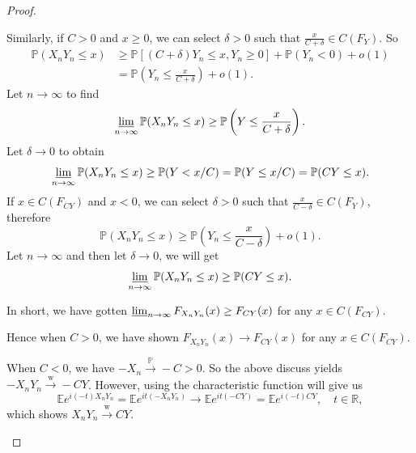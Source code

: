 \documentclass[12pt]{article}
\renewcommand{\(}{\left(}%
\renewcommand{\)}{\right)}%
\renewcommand{\[}{\left[}%
\renewcommand{\]}{\right]}%
\renewcommand{\r}{\mathbb{R}}
\newcommand{\p}{\mathbb{P}}
\newtheorem{proof}{Proof.}}
\begin{document}
\begin{proof}
\begin{enumerate}
  		Similarly, if $C>0$ and $x\geq 0$, we can select $\delta>0$ such that $\frac{x}{C+\delta}\in C(F_{Y})$. So
  		\begin{equation*}
  			\begin{split}
  				\p(X_nY_n\leq x)&\geq \p[(C+\delta)Y_n\leq x,Y_n\geq 0]+\p(Y_n<0)+o(1)\\
  				&=\p\(Y_n\leq \frac{x}{C+\delta} \)+o(1).
  			\end{split}
  		\end{equation*}
  		Let $n\to\infty$ to find
  		\begin{equation*}
  			\varliminf_{n\to\infty}\p(X_nY_n\leq x)\geq \p\(Y\leq \frac{x}{C+\delta }\).
  		\end{equation*}
  		Let $\delta\to 0$ to obtain
  		\begin{equation*}
  			\varliminf_{n\to\infty}\p(X_nY_n\leq x)\geq \p(Y<x/C)=\p(Y\leq  x/C)=\p(CY\leq x).
  		\end{equation*}
  		If $x\in C(F_{CY})$ and $x<0$, we can select $\delta>0$ such that $\frac{x}{C-\delta}\in C(F_{Y})$, therefore
  		\begin{equation*}
  			\p(X_nY_n\leq x)\geq \p\(Y_n\leq \frac{x}{C-\delta} \)+o(1).
  		\end{equation*}
  		Let $n\to\infty$ and then let $\delta\to0$, we will get
  		\begin{equation*}
  			\varliminf_{n\to\infty}\p(X_nY_n\leq x)\geq \p(CY\leq x).
  		\end{equation*}
  		
  		In short, we have gotten $\varliminf_{n\to\infty} F_{X_nY_n}(x)\geq F_{CY}(x)$ for any $x\in C(F_{CY})$.  
  		
  		Hence when $C>0$, we have shown $F_{X_nY_n}(x)\to F_{CY}(x)$ for any $x\in C(F_{CY})$.
  		
  		When $C<0$, we have $-X_n\overset{\p}{\to}-C>0$. So the above discuss yields $-X_nY_n\overset{\mathrm{w}}{\to}-CY$. However, using the characteristic function will give us
  		 \begin{equation*}
  		 	\mathbb{E}e^{i(-t)X_nY_n}=\mathbb{E}e^{it(-X_nY_n)}\to \mathbb{E}e^{it(-CY)}=\mathbb{E}e^{i(-t)CY},\quad t\in\r,
  		 \end{equation*}
  		 which shows $X_nY_n\overset{\mathrm{w}}{\to}CY$.
  	\end{enumerate}
  \end{proof}
  
\end{document}
